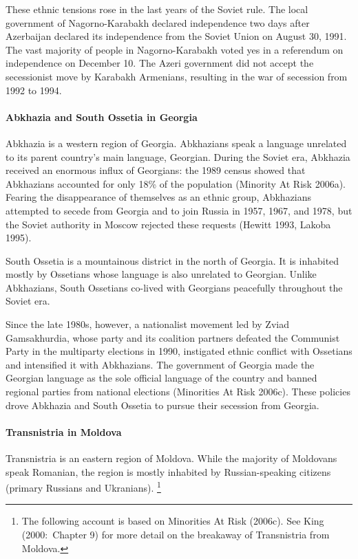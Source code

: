 \documentclass[12pt,a4paper]{article}%
\begin{document}
These ethnic tensions rose in the last years of the Soviet rule. 
The local government of Nagorno-Karabakh declared independence two days after Azerbaijan declared its independence from the Soviet Union on August 30, 1991. 
The vast majority of people in Nagorno-Karabakh voted yes in a referendum on independence on December 10. 
The Azeri government did not accept the secessionist move by Karabakh Armenians, resulting in the war of secession from 1992 to 1994.

\paragraph{Abkhazia and South Ossetia in Georgia}
Abkhazia is a western region of Georgia. Abkhazians speak a language unrelated to its parent country's main language, Georgian. 
During the Soviet era, Abkhazia received an enormous influx of Georgians: the 1989 census showed that Abkhazians accounted for only 18\% of the population (Minority At Risk 2006a).
Fearing the disappearance of themselves as an ethnic group, Abkhazians attempted to secede from Georgia and to join Russia in 1957, 1967, and 1978, but the Soviet authority in Moscow rejected these requests (Hewitt 1993, Lakoba 1995).

South Ossetia is a mountainous district in the north of Georgia. 
It is inhabited mostly by Ossetians whose language is also unrelated to Georgian. 
Unlike Abkhazians, South Ossetians co-lived with Georgians peacefully throughout the Soviet era.

Since the late 1980s, however, a nationalist movement led by Zviad Gamsakhurdia, whose party and its coalition partners defeated the Communist Party in the multiparty elections in 1990, instigated ethnic conflict with Ossetians and intensified it with Abkhazians.
The government of Georgia made the Georgian language as the sole official language of the country and banned regional parties from national elections (Minorities At Risk 2006c).
These policies drove Abkhazia and South Ossetia to pursue their secession from Georgia.

\paragraph{Transnistria in Moldova}
Transnistria is an eastern region of Moldova. While the majority of Moldovans speak Romanian, the region is mostly inhabited by Russian-speaking citizens (primary Russians and Ukranians).%
\footnote{
	The following account is based on Minorities At Risk (2006c). See King (2000:\ Chapter 9) for more detail on the breakaway of Transnistria from Moldova.
} 
\end{document}

